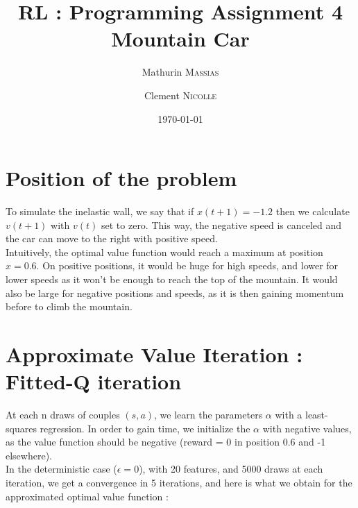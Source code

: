 \documentclass[a4paper, 12pt]{article}
\begin{document}
 
\title{RL : Programming Assignment 4\\Mountain Car}
\author{Mathurin \textsc{Massias} \and Clement \textsc{Nicolle}}
\date{\today} 
 
\maketitle

\section{Position of the problem}

To simulate the inelastic wall, we say that if $x(t+1) = -1.2$ then we calculate $v(t+1)$ with $v(t)$ set to zero. This way, the negative speed is canceled and the car can move to the right with positive speed.\\

Intuitively, the optimal value function would reach a maximum at position $x = 0.6$. On positive positions, it would be huge for high speeds, and lower for lower speeds as it won't be enough to reach the top of the mountain. It would also be large for negative positions and speeds, as it is then gaining momentum before to climb the mountain.

\section{Approximate Value Iteration : Fitted-Q iteration} 

At each n draws of couples $(s,a)$, we learn the parameters $\alpha$ with a least-squares regression. In order to gain time, we initialize the $\alpha$ with negative values, as the value function should be negative (reward = 0 in position 0.6 and -1 elsewhere).\\
In the deterministic case ($\epsilon = 0$), with 20 features, and 5000 draws at each iteration, we get a convergence in 5 iterations, and here is what we obtain for the approximated optimal value function :
\end{document}
